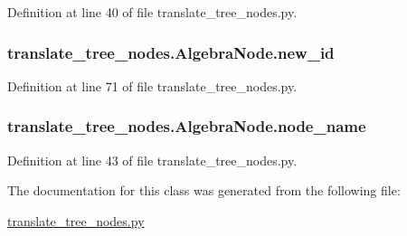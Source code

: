 Definition at line 40 of file translate\+\_\+tree\+\_\+nodes.\+py.

\hypertarget{classtranslate__tree__nodes_1_1_algebra_node_ae5b55b8b4bc4eb136d1f056e04419e78}{}
\subsubsection[{new\+\_\+id}]{\setlength{\rightskip}{0pt plus 5cm}translate\+\_\+tree\+\_\+nodes.\+Algebra\+Node.\+new\+\_\+id}\label{classtranslate__tree__nodes_1_1_algebra_node_ae5b55b8b4bc4eb136d1f056e04419e78}


Definition at line 71 of file translate\+\_\+tree\+\_\+nodes.\+py.

\hypertarget{classtranslate__tree__nodes_1_1_algebra_node_a1ce43e48160b84abc8847aac2daad122}{}
\subsubsection[{node\+\_\+name}]{\setlength{\rightskip}{0pt plus 5cm}translate\+\_\+tree\+\_\+nodes.\+Algebra\+Node.\+node\+\_\+name}\label{classtranslate__tree__nodes_1_1_algebra_node_a1ce43e48160b84abc8847aac2daad122}


Definition at line 43 of file translate\+\_\+tree\+\_\+nodes.\+py.



The documentation for this class was generated from the following file\+:\begin{DoxyCompactItemize}
\item 
\hyperlink{translate__tree__nodes_8py}{translate\+\_\+tree\+\_\+nodes.\+py}\end{DoxyCompactItemize}
